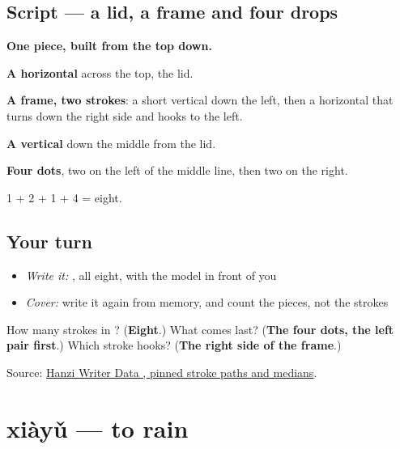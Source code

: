 \subsection*{Script — a lid, a frame and four drops}

\begin{quote}
\end{quote}

\textbf{One piece, built from the top down.}

\textbf{A horizontal} across the top, the lid.

\textbf{A frame, two strokes}: a short vertical down the left, then a horizontal that turns down the right side and hooks to the left.

\textbf{A vertical} down the middle from the lid.

\textbf{Four dots}, two on the left of the middle line, then two on the right.

1 + 2 + 1 + 4 = eight.

\subsection*{Your turn}
\begin{itemize}
\raggedright
  \item \emph{Write it:} , all eight, with the model in front of you
  \item \emph{Cover:} write it again from memory, and count the pieces, not the strokes
\end{itemize}

\begin{tcolorbox}[breakable,colback=teal!4,colframe=teal!35!black,title={Before you move on}]
How many strokes in ? (\textbf{Eight}.) What comes last? (\textbf{The four dots, the left pair first}.) Which stroke hooks? (\textbf{The right side of the frame}.)

Source: \href{https://raw.githubusercontent.com/chanind/hanzi-writer-data/68d10a4b21150cae5e1ebbd223eed289cf32d90c/data/\%E9\%9B\%A8.json}{Hanzi Writer Data , pinned stroke paths and medians}.
\end{tcolorbox}
\section[xiàyǔ]{xiàyǔ — to rain}

\label{lesson:ZH-C66-xiayu}



